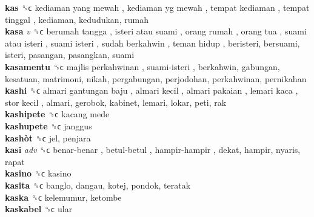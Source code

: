 \textbf{kas} ␝ϲ   kediaman yang mewah ,  kediaman yg mewah ,  tempat kediaman ,  tempat tinggal , kediaman, kedudukan, rumah  \\
\textbf{kasa} \emph{v}  ␝ϲ   berumah tangga ,  isteri atau suami ,  orang rumah ,  orang tua ,  suami atau isteri ,  suami isteri ,  sudah berkahwin ,  teman hidup , beristeri, bersuami, isteri, pasangan, pasangkan, suami  \\
\textbf{kasamentu} ␝ϲ   majlis perkahwinan ,  suami-isteri , berkahwin, gabungan, kesatuan, matrimoni, nikah, pergabungan, perjodohan, perkahwinan, pernikahan  \\
\textbf{kashi} ␝ϲ   almari gantungan baju ,  almari kecil ,  almari pakaian ,  lemari kaca ,  stor kecil , almari, gerobok, kabinet, lemari, lokar, peti, rak  \\
\textbf{kashipete} ␝ϲ   kacang mede   \\
\textbf{kashupete} ␝ϲ  janggus  \\
\textbf{kashòt} ␝ϲ  jel, penjara  \\
\textbf{kasi} \emph{adv}  ␝ϲ   benar-benar ,  betul-betul ,  hampir-hampir , dekat, hampir, nyaris, rapat  \\
\textbf{kasino} ␝ϲ  kasino  \\
\textbf{kasita} ␝ϲ  banglo, dangau, kotej, pondok, teratak  \\
\textbf{kaska} ␝ϲ  kelemumur, ketombe  \\
\textbf{kaskabel} ␝ϲ  ular  \\
